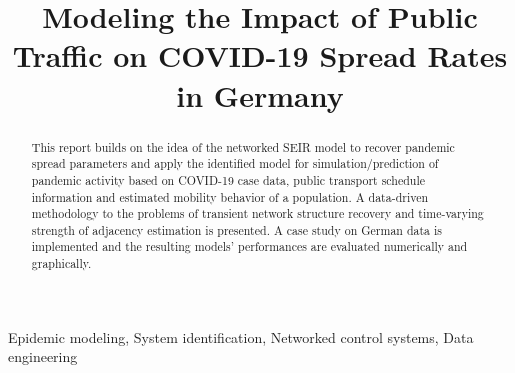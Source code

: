 \documentclass[conference]{IEEEtran}
\begin{document}
\title{Modeling the Impact of Public Traffic on COVID-19 Spread Rates in Germany}

\author{
}

\maketitle


\begin{abstract}
This report builds on the idea of the networked SEIR model to recover pandemic spread parameters and apply the identified model for simulation/prediction of pandemic activity based on COVID-19 case data, public transport schedule information and estimated mobility behavior of a population. A data-driven methodology to the problems of transient network structure recovery and time-varying strength of adjacency estimation is presented. A case study on German data is implemented and the resulting models' performances are evaluated numerically and graphically.
\end{abstract}

\begin{IEEEkeywords}
Epidemic modeling, System identification, Networked control systems, Data engineering
\end{IEEEkeywords}







\appendices






\ifdefined\AddMyGloss
\glsaddall
	\AddMyGloss 
\fi
\end{document}
